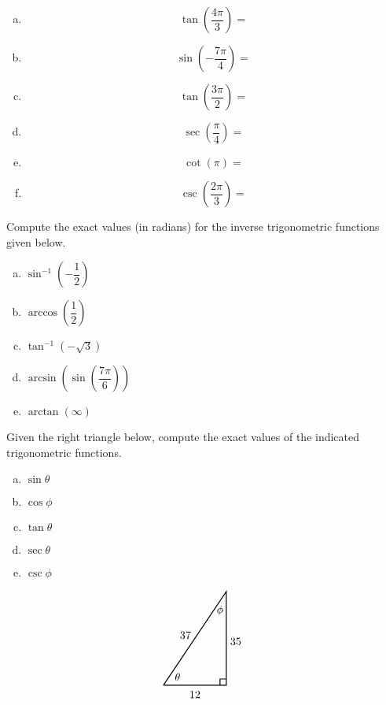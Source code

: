 \documentclass[12pt,letterpaper]{exam}
\begin{document}
\begin{questions}
{\begin{enumerate}[(a)]
\item 
	\[
	\tan \!\left( \dfrac{4\pi}{3} \right)= 
	\]

\item 
	\[
	\sin \!\left( -\dfrac{7\pi}{4} \right)= 
	\]

\item 
	\[
	\tan \!\left( \dfrac{3\pi}{2} \right)= 
	\]

\item 
	\[
	\sec \!\left( \dfrac{\pi}{4} \right)= 
	\]

\item 
	\[
	\cot \left( \pi \right)= 
	\]

\item 
	\[
	\csc \!\left( \dfrac{2\pi}{3} \right)= 
	\]
\end{enumerate}
}



\newpage
\question[10] Compute the exact values (in radians) for the inverse trigonometric functions given below.
	\begin{enumerate}[(a)]
	\item $\sin^{-1} \!\!\left( -\dfrac{1}{2} \right)$
	\item $\arccos \!\left( \dfrac{1}{2} \right)$
	\item $\tan^{-1} \!\left( -\sqrt{3} \right)$
	\item $\arcsin \!\left( \sin \left( \dfrac{7\pi}{6} \right) \right)$
	\item $\arctan(\infty)$
	\end{enumerate}
	


\newpage
\question[10] Given the right triangle below, compute the exact values of the indicated trigonometric functions. \pspace
\begin{minipage}{0.3\textwidth}
        \begin{enumerate}[(a)]
        \item $\sin \theta$
        \item $\cos \phi$
        \item $\tan \theta$
        \item $\sec \theta$
        \item $\csc \phi$
        \end{enumerate}
\end{minipage} \begin{minipage}{0.27\textwidth}        
	\[
	\begin{tikzpicture}
	\draw[line width=0.03cm] (0,0) -- (2,0) -- (2,3) -- (0,0);
	\draw[line width=0.03cm] (1.8,0) -- (1.8,0.2) -- (2,0.2);
	\node at (0.45,0.27) {$\theta$};
	\node at (1.8,2.4) {$\phi$};
	\node at (1,-0.3) {$12$};
	\node at (2.3,1.4) {$35$};
	\node at (0.7,1.6) {$37$};
	\end{tikzpicture}
	\]
\end{minipage}




\end{questions}
\end{document}
